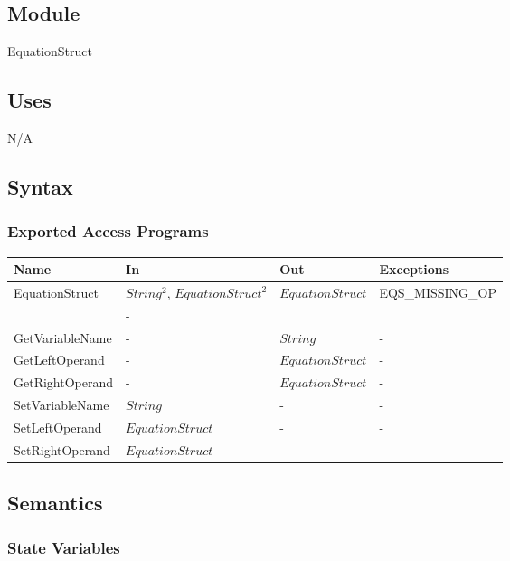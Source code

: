 \documentclass[12pt, titlepage]{article}
\begin{document}
\subsection{Module}

EquationStruct

\subsection{Uses}

N/A

\subsection{Syntax}

\subsubsection{Exported Access Programs}

\begin{center}
	\begin{tabular}{p{3cm} p{3cm} p{3cm} p{5cm}}
		\hline
		\textbf{Name} & \textbf{In} & \textbf{Out} & \textbf{Exceptions} \\
		\hline
		\multirow{2}{3cm}{EquationStruct} & $String^2$, $EquationStruct^2$ & 
		\multirow{2}{3cm}{$EquationStruct$} & 
		\multirow{2}{5cm}{EQS\_MISSING\_OP}\\
		GetOperator & - & $String$ & - \\
		GetVariableName & - & $String$ & - \\
		GetLeftOperand & - & $EquationStruct$ & -\\
		GetRightOperand & - & $EquationStruct$ & - \\
		SetVariableName & $String$ & - & - \\
		SetLeftOperand & $EquationStruct$ & - & - \\
		SetRightOperand & $EquationStruct$ & - & - \\
		\hline
	\end{tabular}
\end{center}

\subsection{Semantics}

\subsubsection{State Variables}
\end{document}
